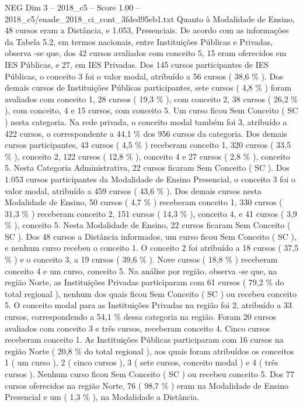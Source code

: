 \begin{textsample}{NEG Dim 3 – 2018\_c5 – Score 1.00 – 2018\_c5/enade\_2018\_ci\_cont\_3fded95eb1.txt}
Quanto à Modalidade de Ensino, 48 cursos eram a Distância, e 1.053, Presenciais.
De acordo com as informações da Tabela 5.2, em termos nacionais, entre Instituições Públicas e Privadas, observa -se que, dos 42 cursos avaliados com conceito 5, 15 eram oferecidos em IES Públicas, e 27, em IES Privadas.
Dos 145 cursos participantes de IES Públicas, o conceito 3 foi o valor modal, atribuído a 56 cursos ( 38,6 \% ).
Dos demais cursos de Instituições Públicas participantes, sete cursos ( 4,8 \% ) foram avaliados com conceito 1, 28 cursos ( 19,3 \% ), com conceito 2, 38 cursos ( 26,2 \% ), com conceito, 4 e 15 cursos, com conceito 5.
Um curso ficou Sem Conceito ( SC ) nesta categoria.
Na rede privada, o conceito modal também foi 3, atribuído a 422 cursos, o correspondente a 44,1 \% dos 956 cursos da categoria.
Dos demais cursos participantes, 43 cursos ( 4,5 \% ) receberam conceito 1, 320 cursos ( 33,5 \% ), conceito 2, 122 cursos ( 12,8 \% ), conceito 4 e 27 cursos ( 2,8 \% ), conceito 5.
Nesta Categoria Administrativa, 22 cursos ficaram Sem Conceito ( SC ).
Dos 1.053 cursos participantes da Modalidade de Ensino Presencial, o conceito 3 foi o valor modal, atribuído a 459 cursos ( 43,6 \% ).
Dos demais cursos nesta Modalidade de Ensino, 50 cursos ( 4,7 \% ) receberam conceito 1, 330 cursos ( 31,3 \% ) receberam conceito 2, 151 cursos ( 14,3 \% ), conceito 4, e 41 cursos ( 3,9 \% ), conceito 5.
Nesta Modalidade de Ensino, 22 cursos ficaram Sem Conceito ( SC ).
Dos 48 cursos a Distância informados, um curso ficou Sem Conceito ( SC ), e nenhum curso recebeu o conceito 1.
O conceito 2 foi atribuído a 18 cursos ( 37,5 \% ) e o conceito 3, a 19 cursos ( 39,6 \% ).
Nove cursos ( 18,8 \% ) receberam conceito 4 e um curso, conceito 5.
Na análise por região, observa -se que, na região Norte, as Instituições Privadas participaram com 61 cursos ( 79,2 \% do total regional ), nenhum dos quais ficou Sem Conceito ( SC ) ou recebeu conceito 5.
O conceito modal para as Instituições Privadas na região foi 2, atribuído a 33 cursos, correspondendo a 54,1 \% dessa categoria na região.
Foram 20 cursos avaliados com conceito 3 e três cursos, receberam conceito 4.
Cinco cursos receberam conceito 1.
As Instituições Públicas participaram com 16 cursos na região Norte ( 20,8 \% do total regional ), aos quais foram atribuídos os conceitos 1 ( um curso ), 2 ( cinco cursos ), 3 ( sete cursos, conceito modal ) e 4 ( três cursos ).
Nenhum curso ficou Sem Conceito ( SC ) ou recebeu conceito 5.
Dos 77 cursos oferecidos na região Norte, 76 ( 98,7 \% ) eram na Modalidade de Ensino Presencial e um ( 1,3 \% ), na Modalidade a Distância.

\end{textsample}
